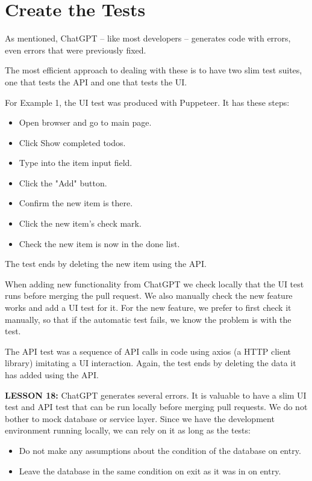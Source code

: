 \documentclass[runningheads]{llncs}
\begin{document}
\section{Create the Tests}
As mentioned, ChatGPT – like most developers – generates code with errors, even errors that were previously fixed.

The most efficient approach to dealing with these is to have two slim test suites, one that tests the API and one that tests the UI.

For Example 1, the UI test was produced with Puppeteer. It has these steps:
\begin{itemize}
    \item Open browser and go to main page.
    \item Click Show completed todos.
    \item Type into the item input field.
    \item Click the "Add" button.
    \item Confirm the new item is there.
    \item Click the new item's check mark.
    \item Check the new item is now in the done list.
\end{itemize}

The test ends by deleting the new item using the API.

When adding new functionality from ChatGPT we check locally that the UI test runs before merging the pull request. We also manually check the new feature works and add a UI test for it. For the new feature, we prefer to first check it manually, so that if the automatic test fails, we know the problem is with the test.

The API test was a sequence of API calls in code using axios (a HTTP client library) imitating a UI interaction. Again, the test ends by deleting the data it has added using the API.

\textbf{LESSON 18:} ChatGPT generates several errors. It is valuable to have a slim UI test and API test that can be run locally before merging pull requests.
We do not bother to mock database or service layer. Since we have the development environment running locally, we can rely on it as long as the tests:
\begin{itemize}
    \item Do not make any assumptions about the condition of the database on entry.
    \item Leave the database in the same condition on exit as it was in on entry.
\end{itemize}
\end{document}
